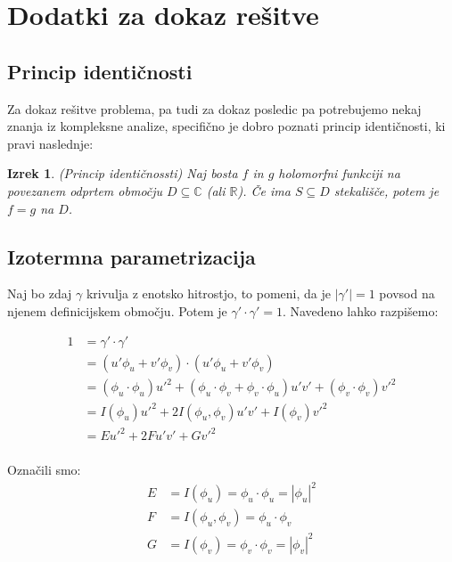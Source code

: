 \documentclass{article}
\newtheorem{izrek}{Izrek}
\begin{document}
    \section{Dodatki za dokaz rešitve}

        \subsection{Princip identičnosti}

            Za dokaz rešitve problema, pa tudi za dokaz posledic pa potrebujemo nekaj znanja iz kompleksne analize, 
            specifično je dobro poznati princip identičnosti, ki pravi naslednje:

            \begin{izrek}{(Princip identičnossti)}
                Naj bosta $f$ in $g$ holomorfni funkciji na povezanem odprtem območju $D \subseteq \mathbb{C}$ (ali $\mathbb{R}$).
                Če ima $S \subseteq D$ stekališče, potem je $f = g$ na $D$.
            \end{izrek}


        \subsection{Izotermna parametrizacija}

            Naj bo zdaj $\gamma$ krivulja z enotsko hitrostjo, to pomeni, da je $\left\lvert \gamma' \right\rvert = 1$ povsod na njenem definicijskem območju.
            Potem je $\gamma' \cdot \gamma' = 1$.
            Navedeno lahko razpišemo:
            
            \begin{align*}
                1 &= \gamma' \cdot \gamma' \\
                &= (u' \phi_u + v' \phi_v) \cdot (u' \phi_u + v' \phi_v)\\
                &= (\phi_u \cdot \phi_u) u'^2 + (\phi_u \cdot \phi_v + \phi_v \cdot \phi_u) u' v' + (\phi_v \cdot \phi_v) v'^2  \\
                &= I(\phi_u) u'^2 + 2 I(\phi_u, \phi_v) u' v' + I(\phi_v) v'^2\\
                &= E u'^2 + 2F u' v' + G v'^2\\
            \end{align*}

            Označili smo:
            \begin{align*}
                E &= I(\phi_u) = \phi_u \cdot \phi_u = \left\lvert \phi_u \right\rvert^2 \\
                F &= I(\phi_u, \phi_v) = \phi_u \cdot \phi_v \\
                G &= I(\phi_v) = \phi_v \cdot \phi_v = \left\lvert \phi_v \right\rvert^2
            \end{align*}
\end{document}
